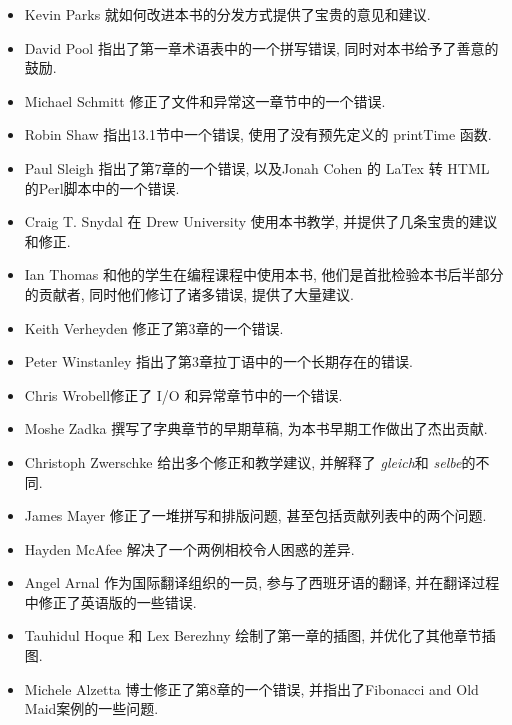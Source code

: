 \documentclass[10pt]{book}
\begin{document}
\begin{itemize}
\item Kevin Parks 就如何改进本书的分发方式提供了宝贵的意见和建议. 

\item David Pool  指出了第一章术语表中的一个拼写错误, 同时对本书给予了善意的鼓励. 

\item Michael Schmitt 修正了文件和异常这一章节中的一个错误. 

\item Robin Shaw 指出13.1节中一个错误, 使用了没有预先定义的 printTime 函数. 

\item Paul Sleigh 指出了第7章的一个错误, 
以及Jonah Cohen 的 LaTex 转 HTML 的Perl脚本中的一个错误. 

\item Craig T. Snydal 在 Drew University 使用本书教学, 
并提供了几条宝贵的建议和修正. 

\item Ian Thomas 和他的学生在编程课程中使用本书, 
他们是首批检验本书后半部分的贡献者, 同时他们修订了诸多错误, 提供了大量建议. 

\item Keith Verheyden 修正了第3章的一个错误. 

\item Peter Winstanley 指出了第3章拉丁语中的一个长期存在的错误. 

\item Chris Wrobell修正了 I/O 和异常章节中的一个错误. 

\item Moshe Zadka 撰写了字典章节的早期草稿, 为本书早期工作做出了杰出贡献. 

\item Christoph Zwerschke 给出多个修正和教学建议, 并解释了
 {\em gleich}和 {\em selbe}的不同. 

\item James Mayer 修正了一堆拼写和排版问题, 甚至包括贡献列表中的两个问题. 

\item Hayden McAfee 解决了一个两例相校令人困惑的差异. 

\item Angel Arnal 作为国际翻译组织的一员, 参与了西班牙语的翻译, 
并在翻译过程中修正了英语版的一些错误. 

\item Tauhidul Hoque 和 Lex Berezhny 绘制了第一章的插图, 并优化了其他章节插图. 

\item Michele Alzetta 博士修正了第8章的一个错误, 
并指出了Fibonacci and Old Maid案例的一些问题. 


\end{itemize}
\end{document}
